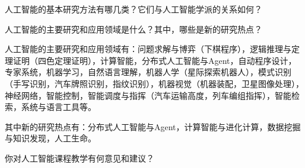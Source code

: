 \begin{question}
人工智能的基本研究方法有哪几类？它们与人工智能学派的关系如何？
\end{question}
\begin{solution}
\end{solution}

\begin{question}
人工智能的主要研究和应用领域是什么？其中，哪些是新的研究热点？
\end{question}
\begin{solution}
人工智能的主要研究和应用领域有：问题求解与博弈（下棋程序），逻辑推理与定理证明（四色定理证明），计算智能，分布式人工智能与Agent，自动程序设计，专家系统，机器学习，自然语言理解，机器人学（星际探索机器人），模式识别（手写识别，汽车牌照识别，指纹识别），机器视觉（机器装配，卫星图像处理），神经网络，智能控制，智能调度与指挥（汽车运输高度，列车编组指挥），智能检索，系统与语言工具等。 \par
其中新的研究热点有：分布式人工智能与Agent，计算智能与进化计算，数据挖掘与知识发现，人工生命。
\end{solution}

\begin{question}
你对人工智能课程教学有何意见和建议？
\end{question}
\begin{solution}
\end{solution}